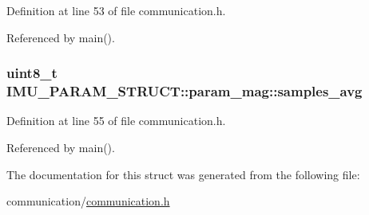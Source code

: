 Definition at line 53 of file communication.\-h.



Referenced by main().

\hypertarget{structIMU__PARAM__STRUCT_1_1param__mag_a52c22cae6940eb39fb72aca66cfeba9a}{
\subsubsection[{samples\-\_\-avg}]{\setlength{\rightskip}{0pt plus 5cm}uint8\-\_\-t I\-M\-U\-\_\-\-P\-A\-R\-A\-M\-\_\-\-S\-T\-R\-U\-C\-T\-::param\-\_\-mag\-::samples\-\_\-avg}}\label{structIMU__PARAM__STRUCT_1_1param__mag_a52c22cae6940eb39fb72aca66cfeba9a}


Definition at line 55 of file communication.\-h.



Referenced by main().



The documentation for this struct was generated from the following file\-:\begin{DoxyCompactItemize}
\item 
communication/\hyperlink{communication_2communication_8h}{communication.\-h}\end{DoxyCompactItemize}

